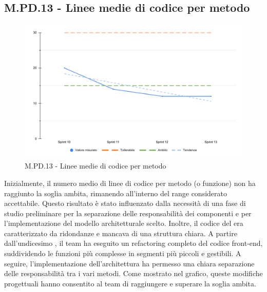 \subsection{M.PD.13 - Linee medie di codice per metodo}

\begin{figure}[H]
  \centering
  \includegraphics[width=\textwidth]{assets/linee_medie_codice.pdf}
  \caption{M.PD.13 - Linee medie di codice per metodo}
\end{figure}

\par Inizialmente, il numero medio di linee di codice per metodo (o funzione) non ha raggiunto la soglia ambita, rimanendo all'interno del range considerato accettabile. Questo risultato è stato influenzato dalla necessità di una fase di studio preliminare per la separazione delle responsabilità dei componenti e per l'implementazione del modello architetturale scelto. Inoltre, il codice del  era caratterizzato da ridondanze e mancava di una struttura chiara. A partire dall'undicesimo , il team ha eseguito un refactoring completo del codice front-end, suddividendo le funzioni più complesse in segmenti più piccoli e gestibili. A seguire, l'implementazione dell'architettura  ha permesso una chiara separazione delle responsabilità tra i vari metodi. Come mostrato nel grafico, queste modifiche progettuali hanno consentito al team di raggiungere e superare la soglia ambita.